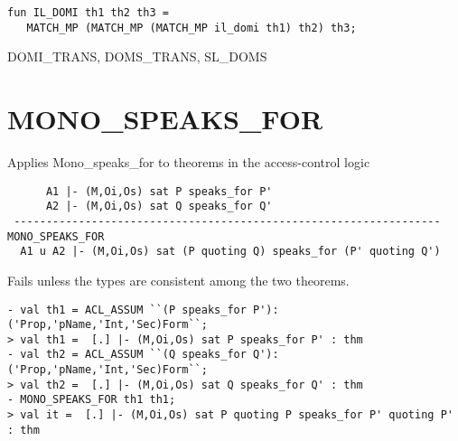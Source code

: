 \IMPLEMENTATION
\begin{holboxed}
\begin{verbatim}
fun IL_DOMI th1 th2 th3 =
   MATCH_MP (MATCH_MP (MATCH_MP il_domi th1) th2) th3;
\end{verbatim}
\end{holboxed}

\SEEALSO
DOMI\_TRANS, DOMS\_TRANS, SL\_DOMS
\ENDDOC

\section{MONO\_SPEAKS\_FOR}



\egroup


\SYNOPSIS
Applies Mono_speaks_for to theorems in the access-control logic

\DESCRIBE

\begin{scriptsize}
\begin{verbatim}
      A1 |- (M,Oi,Os) sat P speaks_for P'
      A2 |- (M,Oi,Os) sat Q speaks_for Q'
 ------------------------------------------------------------------ MONO_SPEAKS_FOR
  A1 u A2 |- (M,Oi,Os) sat (P quoting Q) speaks_for (P' quoting Q')
\end{verbatim}
\end{scriptsize}


\FAILURE 
Fails unless the types are consistent among the two theorems.

\EXAMPLE
\begin{holboxed}
  \begin{scriptsize}
\begin{verbatim}
- val th1 = ACL_ASSUM ``(P speaks_for P'):('Prop,'pName,'Int,'Sec)Form``;
> val th1 =  [.] |- (M,Oi,Os) sat P speaks_for P' : thm
- val th2 = ACL_ASSUM ``(Q speaks_for Q'):('Prop,'pName,'Int,'Sec)Form``;
> val th2 =  [.] |- (M,Oi,Os) sat Q speaks_for Q' : thm
- MONO_SPEAKS_FOR th1 th1;
> val it =  [.] |- (M,Oi,Os) sat P quoting P speaks_for P' quoting P' : thm
\end{verbatim}
  \end{scriptsize}

\end{holboxed}

